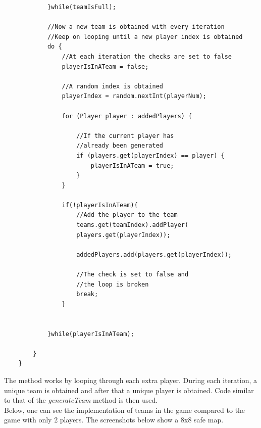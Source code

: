 \documentclass[a4paper,12pt]{extarticle}
\begin{document}
\begin{lstlisting}
            }while(teamIsFull);

            //Now a new team is obtained with every iteration
            //Keep on looping until a new player index is obtained
            do {
                //At each iteration the checks are set to false
                playerIsInATeam = false;

                //A random index is obtained
                playerIndex = random.nextInt(playerNum);

                for (Player player : addedPlayers) {

                    //If the current player has 
                    //already been generated
                    if (players.get(playerIndex) == player) {
                        playerIsInATeam = true;
                    }
                }

                if(!playerIsInATeam){
                    //Add the player to the team
                    teams.get(teamIndex).addPlayer(
                    players.get(playerIndex));

                    addedPlayers.add(players.get(playerIndex));

                    //The check is set to false and 
                    //the loop is broken
                    break;
                }


            }while(playerIsInATeam);

        }
    }
\end{lstlisting}
\vspace{4mm}

\noindent The method works by looping through each extra player. During each iteration, a unique team is obtained and after that a unique player is obtained. Code similar to that of the \textit{generateTeam} method is then used.\\

\newpage
\noindent Below, one can see the implementation of teams in the game compared to the game with only 2 players. The screenshots below show a 8x8 safe map.
\end{document}
